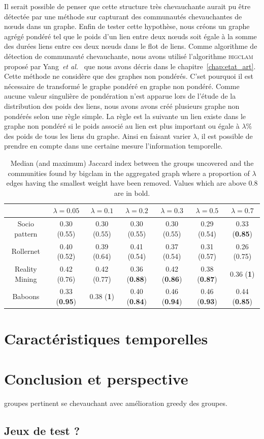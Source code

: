 \bigskip

Il serait possible de penser que cette structure très chevauchante aurait pu être détectée par une méthode sur capturant des communautés chevauchantes de n\oe uds dans un graphe.
Enfin de tester cette hypothèse, nous créons un graphe agrégé pondéré tel que le poids d'un lien entre deux n\oe uds soit égale à la somme des durées liens entre ces deux n\oe uds dans le flot de liens.
Comme algorithme de détection de communauté chevauchante, nous avons utilisé l'algorithme \textsc{bigclam} proposé par Yang~\emph{et al.}~\cite{Yang2013} que nous avons décris dans le chapitre~\ref{chap:etat_art}.
Cette méthode ne considère que des graphes non pondérés.
C'set pourquoi il est nécessaire de transformé le graphe pondéré en graphe non pondéré.
Comme aucune valeur singulière de pondération n'est apparue lors de l'étude de la distribution des poids des liens, nous avons avons créé plusieurs graphe non pondérés selon une règle simple.
La règle est la suivante un lien existe dans le graphe non pondéré si le poids associé au lien est plus important ou égale à $\lambda\%$ des poids de tous les liens du graphe.
Ainsi en faisant varier $\lambda$, il est possible de prendre en compte dans une certaine mesure l'information temporelle.

\begin{table}
\centering
\begin{tabular}{|c|c|c|c|c|c|c|}
\hline  \rule[-1ex]{0pt}{3.5ex}  & $\lambda= 0.05$ &$\lambda= 0.1$ & $\lambda=0.2$ & $\lambda=0.3$ & $\lambda=0.5$ & $\lambda=0.7$ \\ 
\hline Socio pattern & 0.30 (0.55)  & 0.30 (0.55)  & 0.30 (0.55)  & 0.30 (0.55)  & 0.29 (0.54) & 0.33 (\textbf{0.85})  \\ 
\hline Rollernet & 0.40 (0.52) & 0.39 (0.64) & 0.41 (0.54) & 0.37 (0.54) & 0.31 (0.57)  &  0.26 (0.75) \\ 
\hline Reality Mining & 0.42 (0.76)  & 0.42 (0.77) & 0.36 (\textbf{0.88}) & 0.42 (\textbf{0.86}) & 0.38 (\textbf{0.87})  & 0.36 (\textbf{1}) \\ 
\hline Baboons & 0.33 (\textbf{0.95}) & 0.38 (\textbf{1}) & 0.40 (\textbf{0.84}) & 0.46 (\textbf{0.94}) & 0.46 (\textbf{0.93}) & 0.44 (\textbf{0.85}) \\ 
\hline 
\end{tabular} 
\caption{Median (and maximum) Jaccard index between the groups uncovered and the communities found by bigclam in the aggregated graph where  a proportion of $\lambda$ edges having the smallest weight have been removed.
Values which are above $0.8$ are in bold.}
\label{tab:Jaccard}  
\end{table}

\section{Caractéristiques temporelles}

\section{Conclusion et perspective}



groupes pertinent se chevauchant avec amélioration greedy des groupes.
\subsection{Jeux de test ?}